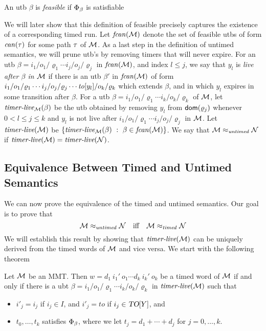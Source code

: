 \begin{definition}
  \label{def:feasible}
  An utb $\beta$ is \emph{feasible} if $\Phi_{\beta}$ is
  satisfiable
\end{definition}
We will later show that this definition of feasible precisely captures
the existence of a corresponding timed run.
Let $\mathit{fcan}({{\mathcal M}})$ denote the set of feasible utbs of form $\mathit{can}({\tau})$ for some
path $\tau$ of ${\mathcal M}$.
As a last step in the definition of untimed semantics, we will
prune utb's by removing timers that will never expire.
For an utb
$\beta  =  {i_1/o_1/\varrho_1}  \cdots {i_j/o_j/\varrho_j}$ in $\mathit{fcan}({{\mathcal M}})$,
and index $l \leq j$,
we say that $y_l$ is \emph{live after $\beta$ in ${\mathcal M}$}
if there is an utb $\beta'$ in $\mathit{fcan}({{\mathcal M}})$ of form
${i_1/o_1/\varrho_1}  \cdots {i_j/o_j/\varrho_j} \cdots {\mathit{to}[y_l]/o_k/\varrho_k}$ which extends $\beta$, and in which 
$y_l$ expires in some transition after $\beta$.
For a utb $\beta  =  {i_1/o_1/\varrho_1}  \cdots {i_k/o_k/\varrho_k}$ of ${\mathcal M}$,
let $\mbox{\it timer-live}_{{\mathcal M}}({\beta})$ be the utb obtained by removing 
$y_l$ from ${\textsf{dom}}(\varrho_j)$ whenever $0 < l \leq j \leq k$ and
$y_l$ is not live after ${i_1/o_1/\varrho_1}  \cdots {i_j/o_j/\varrho_j}$ in ${\mathcal M}$.
Let
$\mbox{\it timer-live}({{\mathcal M}})$ be $\lbrace \mbox{\it timer-live}_{{\mathcal M}}({\beta}) ~:~ \beta \in \mathit{fcan}({{\mathcal M}})\rbrace$.
We say that ${\mathcal M} \approx_{\mathit{untimed}} {\mathcal N}$ if
$\mbox{\it timer-live}({{\mathcal M}}) = \mbox{\it timer-live}({{\mathcal N}})$.

\subsection{Equivalence Between Timed and Untimed Semantics}

We can now prove the equivalence of the timed and untimed semantics.
Our goal is to prove that 
\[
{\mathcal M} \approx_{\mathit{untimed}} {\mathcal N} \quad \mbox{iff} \quad {\mathcal M} \approx_{\mathit{timed}} {\mathcal N}
\]
We will establish this result by showing that $\mbox{\it timer-live}({{\mathcal M}})$ can
be uniquely derived from the timed words of ${\mathcal M}$ and vice versa.
We start with the following theorem

\begin{theorem}
Let ${\mathcal M}$ be an MMT. 
Then $w =  d_1 ~ i_1' ~ o_1 \cdots d_k ~ i_k' ~ o_k$ be a timed word of ${\mathcal M}$
if and only if
there is a ubt
$\beta = {i_1/o_1/\varrho_1}  \cdots {i_k/o_k/\varrho_k}$ in $\mbox{\it timer-live}({{\mathcal M}})$
such that
\begin{itemize}
\item
  $i'_j   =   i_j$ if $i_j \in I$, and
  $i'_j   = \mathit{to}$ if $i_j \in \mbox{\sl TO}[Y]$, and
\item
$t_0, \ldots, t_k$ satisfies $\Phi_{\beta}$, where we let
$t_j = d_1 + \cdots + d_j$ for $j = 0 , \ldots, k$.
\end{itemize}
\end{theorem}

